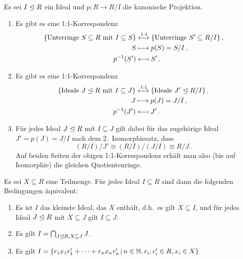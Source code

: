 \begin{lemma}
  \label{lemma: correspondence between ideals}
  Es sei $I \mathrel{\trianglelefteq} R$ ein Ideal und $p \colon R \to R/I$ die kanonische Projektion.
  \begin{enumerate}
    \item
      Es gibt es eine 1:1-Korrespondenz
      \begin{align*}
        \{ \text{Unterringe $S \subseteq R$ mit $I \subseteq S$} \}
        &\xleftrightarrow{1:1}
        \{ \text{Unterringe $S' \subseteq R/I$} \} \,,
        \\
        S
        &\longmapsto
        p(S)
        =
        S/I \,,
        \\
        p^{-1}(S')
        &\longmapsfrom
        S' \,.
      \end{align*}
    \item
      Es gibt es eine 1:1-Korrespondenz
      \begin{align*}
        \{ \text{Ideale $J \mathrel{\trianglelefteq} R$ mit $I \subseteq J$} \}
        &\xleftrightarrow{1:1}
        \{ \text{Ideale $J' \mathrel{\trianglelefteq} R/I$} \} \,,
        \\
        J
        &\longmapsto
        p(J)
        =
        J/I \,,
        \\
        p^{-1}(J')
        &\longmapsfrom
        J' \,.
      \end{align*}
    \item
      Für jedes Ideal $J \mathrel{\trianglelefteq} R$ mit $I \subseteq J$ gilt dabei für das zugehörige Ideal $J' = p(J) = J/I$ nach dem 2.\ Isomorphiesatz, dass
      \[
              (R/I)/J'
        \cong (R/I)/(J/I)
        \cong  R/J \,.
      \]
      Auf beiden Seiten der obigen 1:1-Korrespondenz erhält man also \textup(bis auf Isomorphie\textup) die gleichen Quotientenringe.
  \end{enumerate}

  
\end{lemma}

Es sei $X \subseteq R$ eine Teilmenge.
Für jedes Ideal $I \subseteq R$ sind dann die folgenden Bedingungen äquivalent:

\begin{enumerate}
  \item
    Es ist $I$ das kleinste Ideal, das $X$ enthält, d.h.\ es gilt $X \subseteq I$, und für jedes Ideal $J \mathrel{\trianglelefteq} R$ mit $X \subseteq J$ gilt $I \subseteq J$.
  \item
    Es gilt $I = \bigcap_{J \mathrel{\trianglelefteq} R, X \subseteq J} J$.
  \item
    Es gilt
    $
        I
      = \{
          r_1 x_1 r'_1 + \dotsb + r_n x_n r'_n
        \suchthat
          n \in \Natural,
          r_i, r'_i \in R,
          x_i \in X
        \}
    $
\end{enumerate}

